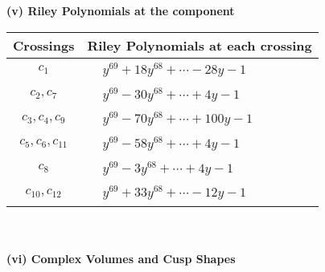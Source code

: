 \documentclass[1p]{elsarticle_modified}
\theoremstyle{definition}
\begin{document}
\newpage\renewcommand{\arraystretch}{1}
\flushleft \textbf{(v) Riley Polynomials at the component}\newline \\
\begin{tabular}{m{50pt}|m{274pt}}
Crossings & \hspace{64pt}Riley Polynomials at each crossing \\
\hline $$\begin{aligned}c_{1}\end{aligned}$$&$\begin{aligned}
&y^{69}+18 y^{68}+\cdots-28 y-1
\end{aligned}$\\
\hline $$\begin{aligned}c_{2},c_{7}\end{aligned}$$&$\begin{aligned}
&y^{69}-30 y^{68}+\cdots+4 y-1
\end{aligned}$\\
\hline $$\begin{aligned}c_{3},c_{4},c_{9}\end{aligned}$$&$\begin{aligned}
&y^{69}-70 y^{68}+\cdots+100 y-1
\end{aligned}$\\
\hline $$\begin{aligned}c_{5},c_{6},c_{11}\end{aligned}$$&$\begin{aligned}
&y^{69}-58 y^{68}+\cdots+4 y-1
\end{aligned}$\\
\hline $$\begin{aligned}c_{8}\end{aligned}$$&$\begin{aligned}
&y^{69}-3 y^{68}+\cdots+4 y-1
\end{aligned}$\\
\hline $$\begin{aligned}c_{10},c_{12}\end{aligned}$$&$\begin{aligned}
&y^{69}+33 y^{68}+\cdots-12 y-1
\end{aligned}$\\
\hline
\end{tabular}\\~\\
\newpage\flushleft \textbf{(vi) Complex Volumes and Cusp Shapes}
\end{document}
